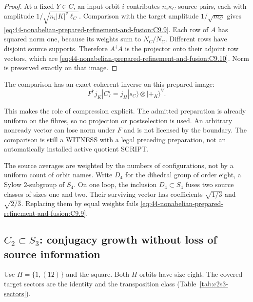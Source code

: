 \begin{proof}
At a fixed $Y\in C$, an input orbit $i$ contributes $n_i\kappa_C$ source pairs,
each with amplitude $1/\sqrt{n_i|K|^v\ell_C}$.  Comparison with the target
amplitude $1/\sqrt{m_C}$ gives
\eqref{eq:44-nonabelian-prepared-refinement-and-fusion:C9.9}.  Each row of $A$
has squared norm one, because its weights sum to $N_C/N_C$.  Different rows
have disjoint source supports.  Therefore $A^\dagger A$ is the projector onto
their adjoint row vectors, which are
\eqref{eq:44-nonabelian-prepared-refinement-and-fusion:C9.10}.  Norm is
preserved exactly on that image.
\end{proof}

The comparison has an exact coherent inverse on this prepared image:
\begin{equation}
F^{\dagger} j_K|C\rangle
     =j_H|s_C\rangle\otimes|+_K\rangle^V.
 \label{eq:44-nonabelian-prepared-refinement-and-fusion:C9.11}
\end{equation}

This makes the role of compression explicit.  The admitted preparation is
already uniform on the fibres, so no projection or postselection is used.  An
arbitrary nonready vector can lose norm under $F$ and is not licensed by the
boundary.  The comparison is still a WITNESS with a legal preceding
preparation, not an automatically installed active quotient SCRIPT.

The source averages are weighted by the numbers of configurations, not by a
uniform count of orbit names.  Write $D_4$ for the dihedral group of order
eight, a Sylow $2$-subgroup of $S_4$.  On one loop, the inclusion
$D_4\subset S_4$ fuses two source classes of sizes one and two.  Their surviving vector has
coefficients $\sqrt{1/3}$ and $\sqrt{2/3}$.  Replacing them by equal weights
fails \eqref{eq:44-nonabelian-prepared-refinement-and-fusion:C9.9}.

\subsection{\texorpdfstring{$C_2\subset S_3$}{C2 in S3}: conjugacy growth without loss of source information}\label{md:44-nonabelian-prepared-refinement-and-fusion:c2s3-conjugacy-growth-without-loss-of-source-information}

Use $H=\{1,(12)\}$ and the square.  Both $H$ orbits have size eight.  The
covered target sectors are the identity and the transposition class
(Table~\ref{tab:c2s3-sectors}).

